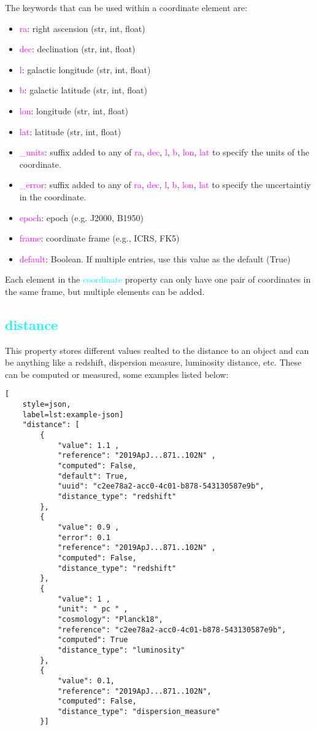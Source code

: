 \documentclass[tighten]{aastex631}
\newcommand{\property}[1]{\textcolor{cyan}{#1}}
\newcommand{\keyword}[1]{\textcolor{magenta}{#1}}
\begin{document}
The keywords that can be used within a coordinate element are:
\begin{itemize}
    \item \keyword{ra}: right ascension (str, int, float)
    \item \keyword{dec}: declination (str, int, float)
    \item \keyword{l}: galactic longitude (str, int, float)
    \item \keyword{b}: galactic latitude (str, int, float)
    \item \keyword{lon}: longitude (str, int, float)
    \item \keyword{lat}: latitude (str, int, float)
    \item \keyword{\_units}: suffix added to any of \keyword{ra}, \keyword{dec}, \keyword{l}, \keyword{b}, \keyword{lon}, \keyword{lat} to specify the units of the coordinate.
    \item \keyword{\_error}: suffix added to any of \keyword{ra}, \keyword{dec}, \keyword{l}, \keyword{b}, \keyword{lon}, \keyword{lat} to specify the uncertaintiy in the coordinate.
    \item \keyword{epoch}: epoch (e.g. J2000, B1950)
    \item \keyword{frame}: coordinate frame (e.g., ICRS, FK5)
    \item \keyword{default}: Boolean. If multiple entries, use this value as the default (True)
\end{itemize}

Each element in the \property{coordinate} property can only have one pair of coordinates in the same frame, but multiple elements can be added. 

\subsection{\property{distance}} \label{sec:distance}

This property stores different values realted to the distance to an object and can be anything like a redshift, dispersion measure, luminosity distance, etc. These can be computed or measured, some examples listed below:

\begin{lstlisting}[
    style=json,
    label=lst:example-json]
    "distance": [
        {
            "value": 1.1 ,
            "reference": "2019ApJ...871..102N" ,
            "computed": False,
            "default": True,
            "uuid": "c2ee78a2-acc0-4c01-b878-543130587e9b",
            "distance_type": "redshift"
        },
        {
            "value": 0.9 ,
            "error": 0.1
            "reference": "2019ApJ...871..102N" ,
            "computed": False,
            "distance_type": "redshift"
        },
        {
            "value": 1 ,
            "unit": " pc " ,
            "cosmology": "Planck18",
            "reference": "c2ee78a2-acc0-4c01-b878-543130587e9b",
            "computed": True
            "distance_type": "luminosity"
        },
        {
            "value": 0.1,
            "reference": "2019ApJ...871..102N",
            "computed": False,
            "distance_type": "dispersion_measure"
        }]
\end{lstlisting}
\end{document}
